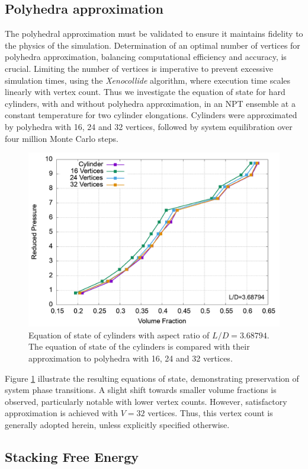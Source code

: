 \documentclass[aip,jcp, amsmath, amssymb, reprint]{revtex4-1}
\begin{document}
\subsection{Polyhedra approximation}
The polyhedral approximation must be validated to ensure it maintains fidelity to the physics of the simulation. Determination of an optimal number of vertices for polyhedra approximation, balancing computational efficiency and accuracy, is crucial. Limiting the number of vertices is imperative to prevent excessive simulation times, using the \textit{Xenocollide} algorithm, where execution time scales linearly with vertex count. Thus we investigate the equation of state for hard cylinders, with and without polyhedra approximation, in an NPT ensemble at a constant temperature for two cylinder elongations. Cylinders were approximated by polyhedra with 16, 24 and 32 vertices, followed by system equilibration over four million Monte Carlo steps.
\begin{figure}[h!]
\includegraphics[width=0.9\linewidth]{cylapprox.png}
\caption{\label{fig:cylapprox} Equation of state of cylinders with aspect ratio of $L/D=3.68794$. The equation of state of the cylinders is compared with their approximation to polyhedra with 16, 24 and 32 vertices.}
\end{figure}

Figure \ref{fig:cylapprox} illustrate the resulting equations of state, demonstrating preservation of system phase transitions. A slight shift towards smaller volume fractions is observed, particularly notable with lower vertex counts. However, satisfactory approximation is achieved with $V=32$ vertices. Thus, this vertex count is generally adopted herein, unless explicitly specified otherwise.

\subsection{Stacking Free Energy}
\end{document}

